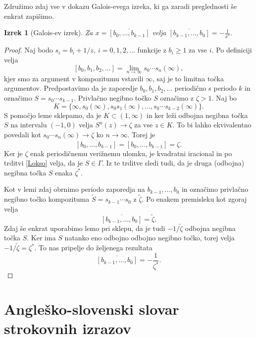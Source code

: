 \documentclass[a4paper,12pt]{article}
\newtheorem*{izrek}{Izrek}
\newenvironment{dokaz}[1][Dokaz]{\begin{proof}}{\end{proof}}
\begin{document}
Združimo zdaj vse v dokazu Galois-evega izreka, ki ga zaradi preglednosti še enkrat zapišimo.

\begin{izrek}[Galois-ev izrek]
	Za $x = \overline{[b_0, \ldots, b_{k-1}]}$ velja $\overline{[b_{k-1}, \ldots, b_0]} = - \frac{1}{x^*}.$
\end{izrek}


\begin{dokaz}
    Naj bodo $s_i = b_i + 1/z,\ i = 0, 1, 2, \ldots$ funkcije z $b_i \geq 1$ za vse $i$. Po definiciji velja
    \[
        [b_0, b_1, b_2, \ldots] = \lim_{n \to \infty} s_0\cdots s_n (\infty),   
    \]
    kjer smo za argument v kompozitumu vstavili $\infty$, saj je to limitna točka argumentov. Predpostavimo da je zaporedje $b_0, b_1, b_2, \ldots$ periodično s periodo $k$ in označimo $S = s_0\cdots s_{k-1}$. Privlačno negibno točko $S$ označimo z $\zeta > 1$. Naj bo
    \[
        K = \{ \infty, s_0(\infty), s_0s_1(\infty), \ldots, s_0\cdots s_{k-2}(\infty)\}.
    \]
    S pomočjo leme sklepamo, da je $K \subset (1, \infty)$ in ker leži odbojna negibna točka $S$ na intervalu $(-1, 0)$ velja $S^n(z) \to \zeta$ za vse $z \in K$. To bi lahko ekvivalentno povedali kot $s_0\cdots s_n(\infty) \to \zeta$ ko $n \to \infty$. Torej je
    \[
        \overline{[b_0, \ldots, b_{k-1}]} = [b_0, \ldots, b_{k-1}] = \zeta.
    \]
    Ker je $\zeta$ enak periodičnemu verižnemu ulomku, je kvadratni iracional in po trditvi \ref{Lokso} velja, da je $S \in \Gamma$. Iz te trditve sledi tudi, da je druga (odbojna) negibna točka $S$ enaka $\zeta^*$.

    Kot v lemi zdaj obrnimo periodo zaporedja na $b_{k-1}, \ldots, b_0$ in označimo privlačno negibno točko kompozituma $\tilde{S} = s_{k-1}\cdots s_0$ z $\tilde{\zeta}$. Po enakem premisleku kot zgoraj velja
    \[
        \overline{[b_{k-1}, \ldots, b_0]} = \tilde{\zeta}.
    \]
    Zdaj še enkrat uporabimo lemo pri sklepu, da je tudi $- 1 / \tilde{\zeta}$ odbojna negibna točka $S$. Ker ima $S$ natanko eno odbojno odbojno negibno točko, torej velja $- 1 / \tilde{\zeta} = \zeta^*$. To nas pripelje do željenega rezultata
    \[
        \overline{[b_{k-1}, \ldots, b_0]} = - \frac{1}{\zeta^*}.
    \]
\end{dokaz}
\newpage


\section*{Angleško-slovenski slovar strokovnih izrazov}
\end{document}
